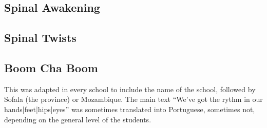 \documentclass[article,twoside]{memoir}
\begin{document}
\subsection{Spinal Awakening}
\subsection{Spinal Twists}
\subsection{Boom Cha Boom}
This was adapted in every school to include the name of the school, followed by
Sofala (the province) or Mozambique. The main text ``We've got the rythm in our
hands|feet|hips|eyes'' was sometimes translated into Portuguese, sometimes not,
depending on the general level of the students.
\end{document}
